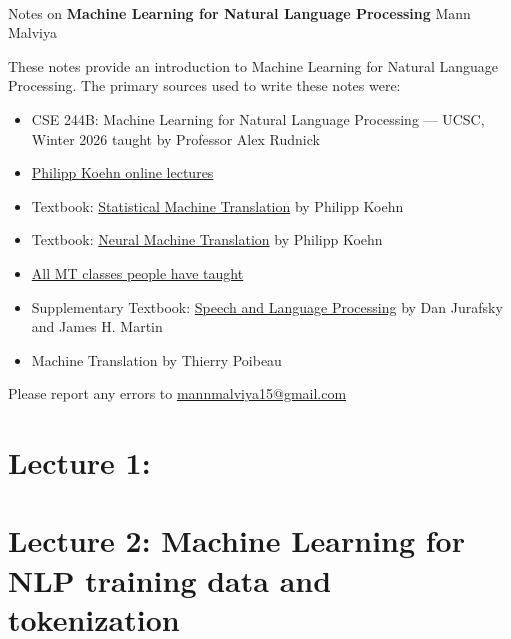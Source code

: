 \documentclass[11pt]{article}
\begin{document}
\thispagestyle{empty}
\bigskip \
\vspace{0.1cm}

\begin{center}
{\fontsize{22}{22} \selectfont Notes on}
\vskip 16pt
{\fontsize{20}{20} \selectfont \bf \sffamily Machine Learning for Natural Language Processing}
\vskip 24pt
{\fontsize{18}{18} \selectfont \rmfamily Mann Malviya}
\vskip 6pt
{\fontsize{14}{14} \selectfont {}}
\vskip 24pt
\end{center}

{\parindent0pt \baselineskip=15.5pt These notes provide an introduction to Machine Learning for Natural Language Processing. The primary sources used to write these notes were:

\begin{itemize}
    \item CSE 244B: Machine Learning for Natural Language Processing — UCSC, Winter 2026 taught by Professor Alex Rudnick
    \item \href{https://www.youtube.com/playlist?list=PLQrCiUDqDLG0lQX54o9jB4phJ-SLI6ZBQ}{Philipp Koehn online lectures}
    \item Textbook: \href{https://www2.statmt.org/book/}{Statistical Machine Translation} by Philipp Koehn
    \item Textbook: \href{https://www2.statmt.org/nmt-book/}{Neural Machine Translation} by Philipp Koehn
    \item \href{http://mt-class.org/}{All MT classes people have taught}
    \item Supplementary Textbook: \href{https://web.stanford.edu/~jurafsky/slp3/}{Speech and Language Processing} by Dan Jurafsky and James H. Martin
    \item Machine Translation by Thierry Poibeau
\end{itemize}

Please report any errors to \href{mailto:mannmalviya15@gmail.com}{mannmalviya15@gmail.com}


}

\newpage
\tableofcontents
\newpage

\section*{Lecture 1:}

\newpage

\section*{Lecture 2: Machine Learning for NLP training data and tokenization}
\end{document}
